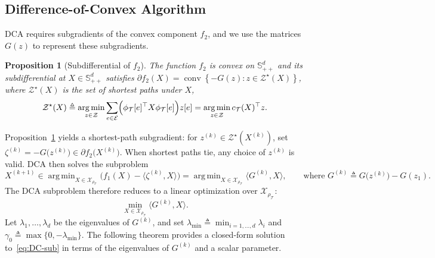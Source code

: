 \documentclass[11pt, letterpaper, oneside, reqno]{amsart}
\DeclareMathOperator*{\argmin}{arg\,min}
\newcommand{\opt}{^\star}
\newcommand{\inner}[2]{\big \langle #1, #2 \big \rangle }
\newcommand{\Let}{\triangleq}
\newtheorem{proposition}{Proposition}
\begin{document}
\subsection{Difference-of-Convex Algorithm}
\label{subsec:DCA}

DCA requires subgradients of the convex component $f_2$, and we use the matrices $G(z)$ to represent these subgradients.

\begin{proposition}[Subdifferential of $f_2$]
\label{prop:subgradient-sA}
The function $f_2$ is convex on $\mathbb S_{++}^d$ and its subdifferential at $X \in \mathbb S_{++}^d$ satisfies $\partial f_2(X) = \operatorname{conv}\left\{ -G(z) : z \in \mathcal Z\opt(X) \right\}$, where $\mathcal Z\opt(X)$ is the set of shortest paths under $X$,
\[
\mathcal Z\opt(X)
\Let
\argmin_{z \in \mathcal Z}
\sum_{e \in \mathcal E}
\Bigl(\phi_{\mathcal T}[e]^\top X \phi_{\mathcal T}[e]\Bigr) z[e]
=
\argmin_{z \in \mathcal Z} c_{\mathcal T}(X)^\top z.
\]
\end{proposition}

Proposition~\ref{prop:subgradient-sA} yields a shortest-path subgradient: for $z^{(k)}\in\mathcal Z\opt(X^{(k)})$, set $\zeta^{(k)} = -G\bigl(z^{(k)}\bigr)\in \partial f_2\bigl(X^{(k)}\bigr)$. 
When shortest paths tie, any choice of $z^{(k)}$ is valid. DCA then solves the subproblem
\[
X^{(k+1)} \in \argmin_{X\in\mathcal X_{\rho_{\mathcal T}}}\bigl(f_1(X)-\inner{\zeta^{(k)}}{X}\bigr)
=
\argmin_{X\in\mathcal X_{\rho_{\mathcal T}}}\inner{G^{(k)}}{X},
\qquad \text{where }
G^{(k)} \Let G\bigl(z^{(k)}\bigr)-G(z_1).
\]
The DCA subproblem therefore reduces to a linear optimization over $\mathcal X_{\rho_{\mathcal T}}$:
\begin{equation}
\label{eq:DC-sub}
\min_{X\in\mathcal X_{\rho_{\mathcal T}}}
\inner{G^{(k)}}{X}.
\end{equation}
Let $\lambda_1,\dots,\lambda_d$ be the eigenvalues of $G^{(k)}$, and set $\lambda_{\min} \Let \min_{i=1,\dots,d} \lambda_i$ and $\gamma_0 \Let \max\{0,-\lambda_{\min}\}$. The following theorem provides a closed-form solution to~\eqref{eq:DC-sub} in terms of the eigenvalues of $G^{(k)}$ and a scalar parameter.
\end{document}
